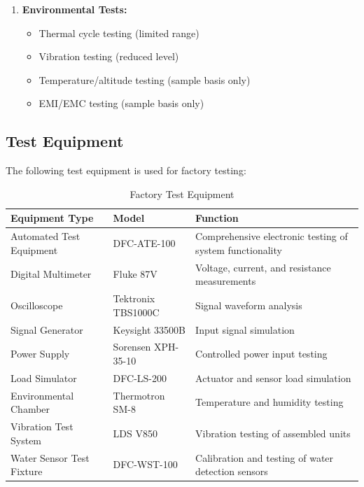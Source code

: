 \documentclass[12pt,a4paper,twoside,openright]{book}
\newcommand{\tabletextfont}{\normalfont\rmfamily}
\newcommand{\tableheadfont}{\normalfont\bfseries}
\begin{document}
\begin{enumerate}
    \item \textbf{Environmental Tests:}
    \begin{itemize}
        \item Thermal cycle testing (limited range)
        \item Vibration testing (reduced level)
        \item Temperature/altitude testing (sample basis only)
        \item EMI/EMC testing (sample basis only)
    \end{itemize}
\end{enumerate}

\subsection{Test Equipment}

The following test equipment is used for factory testing:

\begin{table}[h]
\centering
\setlength{\tabcolsep}{5pt} %
\begin{tabular}{|p{}|p{}|p{}|}
\hline
\tableheadfont\textbf{Equipment Type} & \tableheadfont\textbf{Model} & \tableheadfont\textbf{Function} \\
\hline
\tabletextfont Automated Test Equipment & DFC-ATE-100 & Comprehensive electronic testing of system functionality \\
\hline
\tabletextfont Digital Multimeter & Fluke 87V & Voltage, current, and resistance measurements \\
\hline
\tabletextfont Oscilloscope & Tektronix TBS1000C & Signal waveform analysis \\
\hline
\tabletextfont Signal Generator & Keysight 33500B & Input signal simulation \\
\hline
\tabletextfont Power Supply & Sorensen XPH-35-10 & Controlled power input testing \\
\hline
\tabletextfont Load Simulator & DFC-LS-200 & Actuator and sensor load simulation \\
\hline
\tabletextfont Environmental Chamber & Thermotron SM-8 & Temperature and humidity testing \\
\hline
\tabletextfont Vibration Test System & LDS V850 & Vibration testing of assembled units \\
\hline
\tabletextfont Water Sensor Test Fixture & DFC-WST-100 & Calibration and testing of water detection sensors \\
\hline
\end{tabular}
\caption{Factory Test Equipment}
\end{table}
\end{document}
